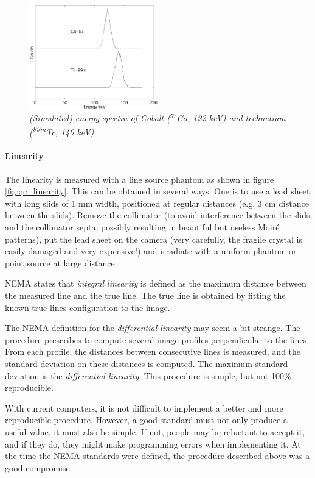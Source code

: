 \documentclass[11pt,oneside]{article}
\begin{document}
\begin{figure}[tb]
\centering
\includegraphics[width=0.5\textwidth]{figs/fig_qc_enresol.pdf}
\caption{\label{fig:qc_enresol} \emph{(Simulated) energy spectra of Cobalt
($^{57}$Co, 122 keV) and technetium (\textsuperscript{99m}Tc, 140 keV).}}
\end{figure}

\paragraph{Linearity}
The linearity is measured with a line source phantom as shown in
figure \ref{fig:qc_linearity}. This can be obtained in several
ways. One is to use a lead sheet with long slids of 1 mm width,
positioned at regular distances (e.g. 3 cm distance between the
slids). Remove the collimator (to avoid interference between the slids
and the collimator septa, possibly resulting in beautiful but useless
Moir\'e patterns), put the lead sheet on the camera (very carefully,
the fragile crystal is easily damaged and very expensive!) and
irradiate with a uniform phantom or point source at large distance.

NEMA states that {\em integral linearity} is defined as the maximum distance
between the measured line and the true line. The true line is obtained by
fitting the known true lines configuration to the image.

The NEMA definition for the {\em differential linearity} may seem a bit
strange. The procedure prescribes to compute several image profiles
perpendicular to the lines. From each profile, the distances between
consecutive lines is measured, and the standard deviation on these distances is
computed. The maximum standard deviation is the {\em differential linearity}.
This procedure is simple, but not 100\% reproducible.

With current computers, it is not difficult to implement a better and more
reproducible procedure. However, a good standard must not only produce a
useful value, it must also be simple. If not, people may be reluctant to
accept it, and if they do, they might make programming errors when
implementing it. At the time the NEMA standards were defined, the procedure
described above was a good compromise.
\end{document}
